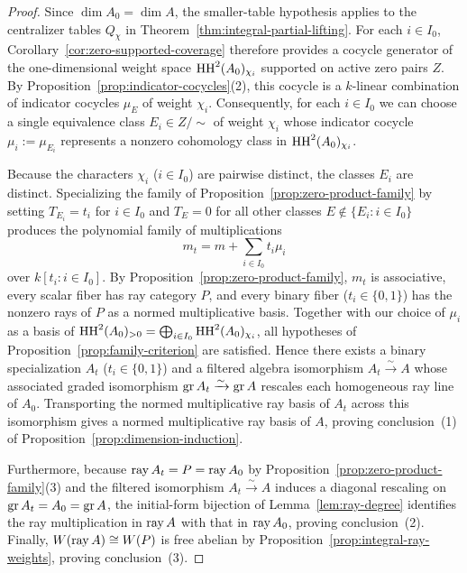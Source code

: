 \begin{proof}
Since $\dim A_0=\dim A$, the smaller-table hypothesis applies to the centralizer tables $Q_\chi$ in Theorem~\ref{thm:integral-partial-lifting}. For each $i\in I_0$, Corollary~\ref{cor:zero-supported-coverage} therefore provides a cocycle generator of the one-dimensional weight space $\operatorname{HH}^2(A_0)_{\chi_i}$ supported on active zero pairs $Z$. By Proposition~\ref{prop:indicator-cocycles}(2), this cocycle is a $k$-linear combination of indicator cocycles $\mu_E$ of weight $\chi_i$. Consequently, for each $i\in I_0$ we can choose a single equivalence class $E_i\in Z/{\sim}$ of weight $\chi_i$ whose indicator cocycle $\mu_i:=\mu_{E_i}$ represents a nonzero cohomology class in $\operatorname{HH}^2(A_0)_{\chi_i}$.

Because the characters $\chi_i$ ($i\in I_0$) are pairwise distinct, the classes $E_i$ are distinct. Specializing the family of Proposition~\ref{prop:zero-product-family} by setting $T_{E_i}=t_i$ for $i\in I_0$ and $T_E=0$ for all other classes $E\notin\{E_i:i\in I_0\}$ produces the polynomial family of multiplications
\begin{equation}
  m_t=m+\sum_{i\in I_0}t_i\mu_i
  \label{eq:selected-binary-family}
\end{equation}
over $k[t_i:i\in I_0]$. By Proposition~\ref{prop:zero-product-family}, $m_t$ is associative, every scalar fiber has ray category $P$, and every binary fiber ($t_i\in\{0,1\}$) has the nonzero rays of $P$ as a normed multiplicative basis. Together with our choice of $\mu_i$ as a basis of $\operatorname{HH}^2(A_0)_{>0}=\bigoplus_{i\in I_0}\operatorname{HH}^2(A_0)_{\chi_i}$, all hypotheses of Proposition~\ref{prop:family-criterion} are satisfied. Hence there exists a binary specialization $A_t$ ($t_i\in\{0,1\}$) and a filtered algebra isomorphism $A_t\xrightarrow{\sim}A$ whose associated graded isomorphism $\operatorname{gr} A_t\xrightarrow{\sim}\operatorname{gr} A$ rescales each homogeneous ray line of $A_0$. Transporting the normed multiplicative ray basis of $A_t$ across this isomorphism gives a normed multiplicative ray basis of $A$, proving conclusion~(1) of Proposition~\ref{prop:dimension-induction}.

Furthermore, because $\operatorname{ray} A_t=P=\operatorname{ray} A_0$ by Proposition~\ref{prop:zero-product-family}(3) and the filtered isomorphism $A_t\xrightarrow{\sim}A$ induces a diagonal rescaling on $\operatorname{gr} A_t=A_0=\operatorname{gr} A$, the initial-form bijection of Lemma~\ref{lem:ray-degree} identifies the ray multiplication in $\operatorname{ray} A$ with that in $\operatorname{ray} A_0$, proving conclusion~(2). Finally, $W(\operatorname{ray} A)\cong W(P)$ is free abelian by Proposition~\ref{prop:integral-ray-weights}, proving conclusion~(3).
\end{proof}

